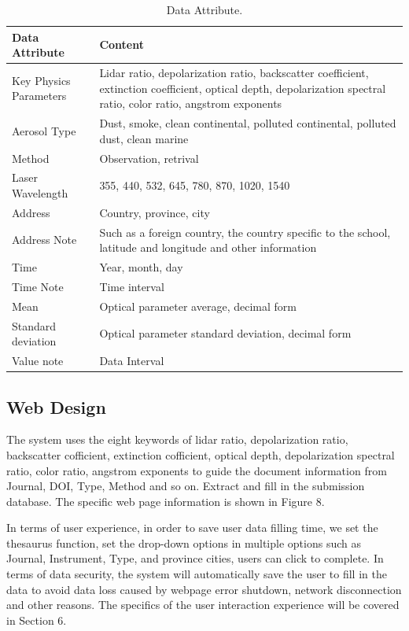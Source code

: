 \begin{table}
	\caption{Data Attribute.}
	\label{tab:freq}
	\begin{tabular}{lp{}}
		\toprule
		Data Attribute&Content\\
		\midrule
		Key Physics Parameters & Lidar ratio, depolarization ratio, backscatter coefficient, extinction coefficient, optical depth, depolarization spectral ratio, color ratio, angstrom exponents\\
		Aerosol Type & Dust, smoke, clean continental, polluted continental, polluted dust, clean marine\\
		Method & Observation, retrival\\
		Laser Wavelength & 355, 440, 532, 645, 780, 870, 1020, 1540\\
		Address & Country, province, city\\
		Address Note & Such as a foreign country, the country specific to the school, latitude and longitude and other information\\
		Time & Year, month, day\\
		Time Note & Time interval\\
		Mean & Optical parameter average, decimal form\\
		Standard deviation & Optical parameter standard deviation, decimal form\\
		Value note & Data Interval\\
		\bottomrule
	\end{tabular}
\end{table}

\subsection{Web Design}
The system uses the eight keywords of lidar ratio, depolarization ratio, backscatter cofficient, extinction cofficient, optical depth, depolarization spectral ratio, color ratio, angstrom exponents to guide the document information from Journal, DOI, Type, Method and so on. Extract and fill in the submission database. The specific web page information is shown in Figure 8.

In terms of user experience, in order to save user data filling time, we set the thesaurus function, set the drop-down options in multiple options such as Journal, Instrument, Type, and province cities, users can click to complete. In terms of data security, the system will automatically save the user to fill in the data to avoid data loss caused by webpage error shutdown, network disconnection and other reasons. The specifics of the user interaction experience will be covered in Section 6.

